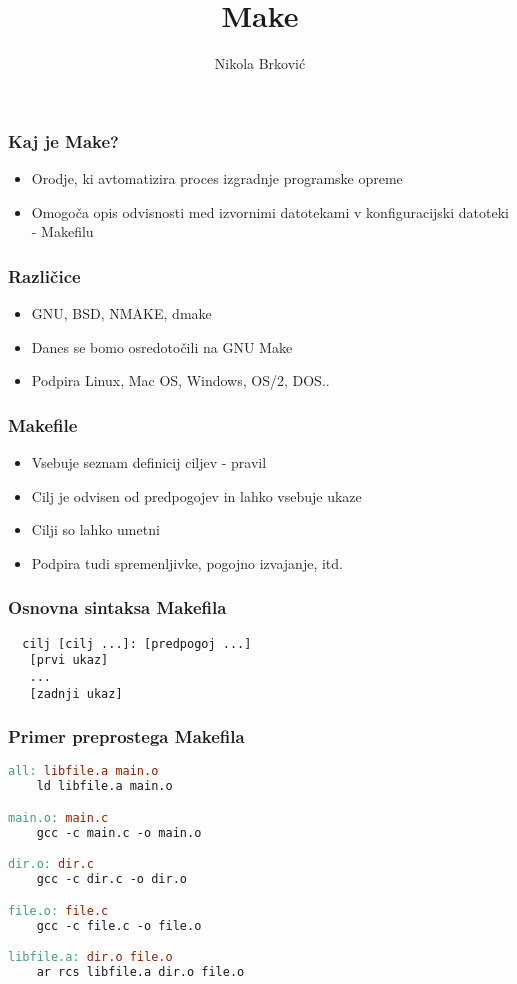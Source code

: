 \documentclass{beamer}
\title{Make}
\author{Nikola Brković}
\begin{document}
\frame{\titlepage}

\begin{frame}
  \frametitle{Kaj je Make?}

  \begin{itemize}
  \item Orodje, ki avtomatizira proces izgradnje programske opreme
  \item Omogoča opis odvisnosti med izvornimi datotekami v
    konfiguracijski datoteki - Makefilu
  \end{itemize}
\end{frame}

\begin{frame}
  \frametitle{Različice}
  
  \begin{itemize}
  \item GNU, BSD, NMAKE, dmake
  \item Danes se bomo osredotočili na GNU Make
  \item Podpira Linux, Mac OS, Windows, OS/2, DOS..
  \end{itemize}
\end{frame}  

\begin{frame}
  \frametitle{Makefile}

  \begin{itemize}
  \item Vsebuje seznam definicij ciljev - pravil
  \item Cilj je odvisen od predpogojev in lahko vsebuje ukaze
  \item Cilji so lahko umetni
  \item Podpira tudi spremenljivke, pogojno izvajanje, itd.
  \end{itemize}
\end{frame}

\begin{frame}[fragile]
  \frametitle{Osnovna sintaksa Makefila}
  
\begin{verbatim}
  cilj [cilj ...]: [predpogoj ...]
   [prvi ukaz]
   ...
   [zadnji ukaz]
\end{verbatim}
\end{frame}

\begin{frame}[t, fragile]
  \frametitle{Primer preprostega Makefila}

\begin{lstlisting}[language=make, frame=single]
all: libfile.a main.o
	ld libfile.a main.o

main.o: main.c
	gcc -c main.c -o main.o

dir.o: dir.c
	gcc -c dir.c -o dir.o

file.o: file.c
	gcc -c file.c -o file.o

libfile.a: dir.o file.o
	ar rcs libfile.a dir.o file.o
\end{lstlisting}
\end{frame}
\end{document}
